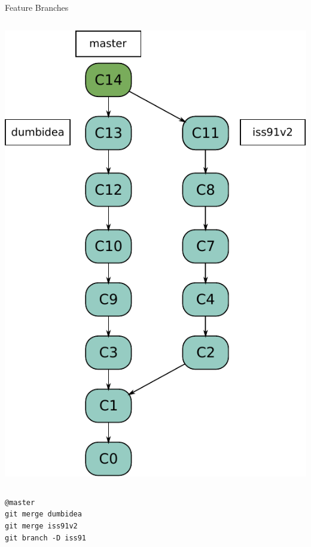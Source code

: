 \begin{frame}{Feature Branches}
\begin{columns}[T]
\begin{column}{.45\textwidth}
\begin{block}{}
        \pause \includegraphics[scale=0.4]{images/branches/feature-branches2.pdf}
    \end{block}
  \end{column}
\end{columns}  
\begin{tiny}
\pause \texttt{@master} \\
\pause \texttt{git merge dumbidea} \\
\pause \texttt{git merge iss91v2} \\
\pause \texttt{git branch -D iss91} \\
\end{tiny}
\end{frame}


